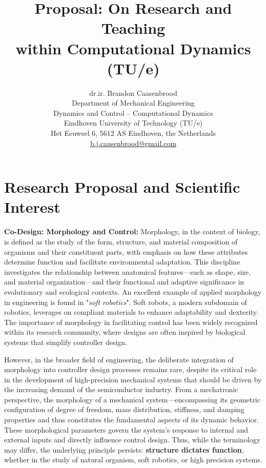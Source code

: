 \documentclass[12pt]{article}
\title{Proposal: On Research and Teaching \\ within Computational Dynamics (TU/e)}
\author{
dr.ir. Brandon Caasenbrood\\
  Department of Mechanical Engineering\\
  Dynamics and Control -- Computational Dynamics \\[0.5em]
  Eindhoven University of Technology (TU/e)\\
  Het Eeuwsel 6, 5612 AS Eindhoven, the Netherlands\\
  \url{b.j.caasenbrood@gmail.com}
  \vspace{-8mm}
}
\begin{document}
\maketitle

\vspace{-10mm}
\section*{Research Proposal and Scientific Interest}
\hspace{5mm} \textbf{Co-Design: Morphology and Control:} Morphology, in the context of biology, is defined as the study of the form, structure, and material composition of organisms and their constituent parts, with emphasis on how these attributes determine function and facilitate environmental adaptation. This discipline investigates the relationship between anatomical features—such as shape, size, and material organization—and their functional and adaptive significance in evolutionary and ecological contexts. An excellent example of applied morphology in engineering is found in "\textit{soft robotics}". Soft robots, a modern subdomain of robotics, leverages on compliant materials to enhance adaptability and dexterity. The importance of morphology in facilitating control has been widely recognized within its research community, where designs are often inspired by biological systems that simplify controller design. 

\hspace{5mm} However, in the broader field of engineering, the deliberate integration of morphology into controller design processes remains rare, despite its critical role in the development of high-precision mechanical systems that should be driven by the increasing demand of the semiconductor industry. From a mechatronic perspective, the morphology of a mechanical system—encompassing its geometric configuration of degree of freedom, mass distribution, stiffness, and damping properties and thus constitutes the fundamental aspects of its dynamic behavior. These morphological parameters govern the system’s response to internal and external inputs and directly influence control design. Thus, while the terminology may differ, the underlying principle persists: \textbf{structure dictates function}, whether in the study of natural organism, soft robotics, or high precision systems. 
\end{document}
